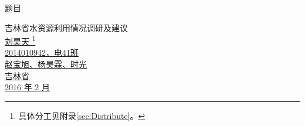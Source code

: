 \documentclass[a4paper,UTF8]{ctexart}%
\author{电41班~刘昊天~2014010942}
\title{\mytitle}
\newcommand{\mytitle}{题目}
\begin{document}
    \begin{titlepage}
        \begin{flushleft}
            \large \kaishu \mytitle
        \end{flushleft} 
        \begin{center}  
            \kaishu     
            \vfill \Huge
            吉林省水资源利用情况调研及建议\\
            \vfill
            \renewcommand{\ULthickness}{0.1pt}
            \ULdepth=3pt  \LARGE
             \uline{\hfill 刘昊天 \hfill}\footnote{具体分工见附录\ref{sec:Distribute}。}
            \vspace{1mm}
            \\ \uline{\hfill 2014010942，电41班 \hfill}
            \vspace{1mm}
            \\  \uline{\hfill 赵宝旭、杨昊霖、时光 \hfill}
            \vspace{1mm}
            \\ \uline{\hfill 吉林省 \hfill}
            \vspace{1mm}
            \\ \uline{\hfill 2016 年 2 月 \hfill}
        \end{center}
    \end{titlepage}
    \thispagestyle{empty}
    \tableofcontents
    \newpage
    \pagestyle{headings}
    \setcounter{page}{1}
    \maketitle
    \begin{abstract}
        吉林省属于水资源相对短缺的地区。本调研通过宏观数据统计与微观个体访谈，立体地展现了吉林省水资源的利用情况。本调研从农业、工业、生活三个方面出发，分析了吉林省水资源利用的途径，进而发现其中的经验与问题。文末，本调研从多方面给出了对吉林省水资源利用的建言。
        \\[1\baselineskip] \textbf{关键字：}吉林省，水资源，节水建言
    \end{abstract}

    \newpage
    
    
\end{document}
